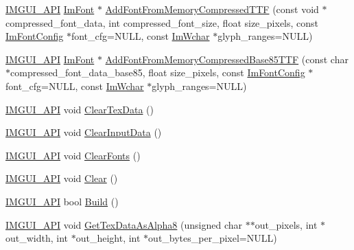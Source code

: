 \begin{DoxyCompactItemize}
\mbox{\hyperlink{imgui_8h_a43829975e84e45d1149597467a14bbf5}{I\+M\+G\+U\+I\+\_\+\+A\+PI}} \mbox{\hyperlink{struct_im_font}{Im\+Font}} $\ast$ \mbox{\hyperlink{struct_im_font_atlas_a579bb434bd116ea9ac4f892652ccefdb}{Add\+Font\+From\+Memory\+Compressed\+T\+TF}} (const void $\ast$compressed\+\_\+font\+\_\+data, int compressed\+\_\+font\+\_\+size, float size\+\_\+pixels, const \mbox{\hyperlink{struct_im_font_config}{Im\+Font\+Config}} $\ast$font\+\_\+cfg=N\+U\+LL, const \mbox{\hyperlink{imgui_8h_af2c7badaf05a0008e15ef76d40875e97}{Im\+Wchar}} $\ast$glyph\+\_\+ranges=N\+U\+LL)
\item 
\mbox{\hyperlink{imgui_8h_a43829975e84e45d1149597467a14bbf5}{I\+M\+G\+U\+I\+\_\+\+A\+PI}} \mbox{\hyperlink{struct_im_font}{Im\+Font}} $\ast$ \mbox{\hyperlink{struct_im_font_atlas_ab43b930beb57c0b998f42f4586677956}{Add\+Font\+From\+Memory\+Compressed\+Base85\+T\+TF}} (const char $\ast$compressed\+\_\+font\+\_\+data\+\_\+base85, float size\+\_\+pixels, const \mbox{\hyperlink{struct_im_font_config}{Im\+Font\+Config}} $\ast$font\+\_\+cfg=N\+U\+LL, const \mbox{\hyperlink{imgui_8h_af2c7badaf05a0008e15ef76d40875e97}{Im\+Wchar}} $\ast$glyph\+\_\+ranges=N\+U\+LL)
\item 
\mbox{\hyperlink{imgui_8h_a43829975e84e45d1149597467a14bbf5}{I\+M\+G\+U\+I\+\_\+\+A\+PI}} void \mbox{\hyperlink{struct_im_font_atlas_a3ede4bd513bec044c77ac392ad9c6e86}{Clear\+Tex\+Data}} ()
\item 
\mbox{\hyperlink{imgui_8h_a43829975e84e45d1149597467a14bbf5}{I\+M\+G\+U\+I\+\_\+\+A\+PI}} void \mbox{\hyperlink{struct_im_font_atlas_a3f5bcbb7a2683b1af106fcf4e1217662}{Clear\+Input\+Data}} ()
\item 
\mbox{\hyperlink{imgui_8h_a43829975e84e45d1149597467a14bbf5}{I\+M\+G\+U\+I\+\_\+\+A\+PI}} void \mbox{\hyperlink{struct_im_font_atlas_ad5c2560d708bd0c389e9bd9da2d9b055}{Clear\+Fonts}} ()
\item 
\mbox{\hyperlink{imgui_8h_a43829975e84e45d1149597467a14bbf5}{I\+M\+G\+U\+I\+\_\+\+A\+PI}} void \mbox{\hyperlink{struct_im_font_atlas_a8f6d01c671d8670f991ba651bbaf7e77}{Clear}} ()
\item 
\mbox{\hyperlink{imgui_8h_a43829975e84e45d1149597467a14bbf5}{I\+M\+G\+U\+I\+\_\+\+A\+PI}} bool \mbox{\hyperlink{struct_im_font_atlas_a81e39e30dffa4dd7e458a53297451e27}{Build}} ()
\item 
\mbox{\hyperlink{imgui_8h_a43829975e84e45d1149597467a14bbf5}{I\+M\+G\+U\+I\+\_\+\+A\+PI}} void \mbox{\hyperlink{struct_im_font_atlas_aeff1a1044a1ab68d8f27bb2819cd9f44}{Get\+Tex\+Data\+As\+Alpha8}} (unsigned char $\ast$$\ast$out\+\_\+pixels, int $\ast$out\+\_\+width, int $\ast$out\+\_\+height, int $\ast$out\+\_\+bytes\+\_\+per\+\_\+pixel=N\+U\+LL)
$$
\end{DoxyCompactItemize}
